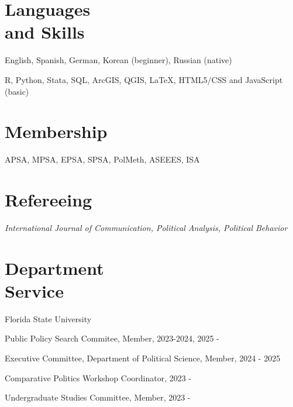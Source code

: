 \documentclass[margin,line,10.95pt]{res}
\newenvironment{list1}{
  \begin{list}{\ding{113}}{%
      \setlength{\itemsep}{0in}
      \setlength{\parsep}{0in} \setlength{\parskip}{0in}
      \setlength{\topsep}{0in} \setlength{\partopsep}{0in}
      \setlength{\leftmargin}{0.17in}}}{\end{list}}
\begin{document}
\begin{resume}

\section{\sc Languages \\ and Skills}
English, Spanish, German, Korean (beginner), Russian (native)
\vspace*{-4.5mm}

R, Python, Stata, SQL, ArcGIS, QGIS, \LaTeX , HTML5/CSS and JavaScript (basic) 
\vspace*{-2.5mm}

\section{\sc Membership}

APSA, MPSA, EPSA, SPSA, PolMeth, ASEEES, ISA

\section{\sc Refereeing}
\textit{International Journal of Communication, Political Analysis, Political Behavior}


\section{\sc Department \\ Service}

{Florida State University}\\
\vspace*{-.1in}
\begin{list1}
\item[] Public Policy Search Commitee, Member, 2023-2024, 2025 - 
\item[] Executive Committee, Department of Political Science, Member, 2024 - 2025
\item[] Comparative Politics Workshop Coordinator, 2023 -
\item[] Undergraduate Studies Committee, Member, 2023 -
\end{list1}


\end{resume}
\end{document}
